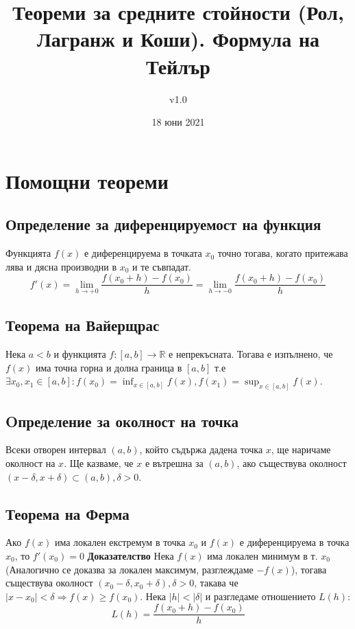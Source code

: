 \documentclass[fleqn,12pt]{article}
\title{Теореми  за  средните  стойности  (Рол,  Лагранж  и  Коши).  Формула  на Тейлър}
\author{v1.0}
\date{18 юни 2021}
\begin{document}
    
\maketitle

\tableofcontents
\pagebreak
    
\section{Помощни теореми}

\subsection{Определение за диференцируемост на функция}
Функцията $f(x)$ е диференцируема в точката $x_0$ точно тогава, когато притежава лява и дясна производни в $x_0$ и те съвпадат.
\[f'(x) = \lim_{h \to +0} \frac{f(x_0 + h)-f(x_0)}{h} = \lim_{h \to -0} \frac{ f(x_0 + h)-f(x_0)}{h}\]

\subsection{Теорема на Вайерщрас}
Нека $a<b$ и функцията $f:[a,b]\rightarrow\mathbb{R}$ е непрекъсната. Тогава е изпълнено, че $f(x)$ има точна горна и долна граница в $[a,b]$
т.е $\exists x_0,x_1 \in [a,b]: f(x_0)=\inf_{x \in [a,b]} f(x), f(x_1)=\sup_{x \in [a,b]} f(x)$.

\subsection{Oпределение за околност на точка}
Всеки отворен интервал $(a,b)$, който съдържа дадена точка $x$, ще наричаме околност на $x$. Ще казваме, че $x$ е вътрешна за $(a,b)$, ако
съществува околност $(x-\delta,x+\delta) \subset (a,b), \delta > 0$.

\subsection{Теорема на Ферма}
Ако $f(x)$ има локален екстремум в точка $x_0$ и $f(x)$ е диференцируема в точка $x_0$, то $f'(x_0)=0$
\bigbreak
\textbf{Доказателство}
Нека $f(x)$ има локален минимум в т. $x_0$ (Аналогично се доказва за локален максимум, разглеждаме $-f(x)$),
тогава съществува околност $(x_0 - \delta,x_0 + \delta), \delta > 0$, такава че $|x-x_0| < \delta \Rightarrow f(x) \geq f(x_0)$.
Нека $|h| < |\delta|$ и разгледаме отношението $L(h)$:
\[ L(h) = \frac{f(x_0 + h) - f(x_0)}{h} \]
\end{document}
